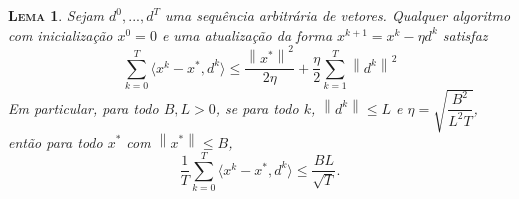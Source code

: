 \documentclass[
	12pt,				%
    oneside,			%
	a4paper,			%
	english,			%
	french,				%
	spanish,			%
	brazil,				%
	]{abntex2}
\newtheorem{lema}[theorem]{\scshape Lema}
\newcommand{\norm}[1]{\left\lVert#1\right\rVert}
\begin{document}
         \begin{lema}
            \label{lem:sgd}
            Sejam $d^0, ..., d^T$ uma sequência arbitrária de vetores. Qualquer algoritmo com inicialização $x^0 = 0$ e uma atualização da forma $x^{k+1} = x^k - \eta d^k$ satisfaz
            \begin{equation}\label{eq:boundgdlema}
                \sum_{k=0}^{T}\langle x^k - x^{*}, d^k \rangle \leq \frac{\norm{x^{*}}^2}{2\eta} + \frac{\eta}{2}\sum_{k=1}^{T} \norm{d^k}^2
            \end{equation}
            Em particular, para todo $B,L>0$, se para todo $k$, $\norm{d^k} \leq L$ e $\eta = \sqrt{\dfrac{B^2}{L^2T}}$, então para todo $x^{*}$ com $\norm{x^{*}} \leq B$,
            \begin{equation}\label{eq:lemasgd}
                \frac{1}{T}\sum_{k=0}^{T}\langle x^k - x^{*}, d^k \rangle \leq \dfrac{BL}{\sqrt{T}}.
            \end{equation}
        \end{lema}
\end{document}
